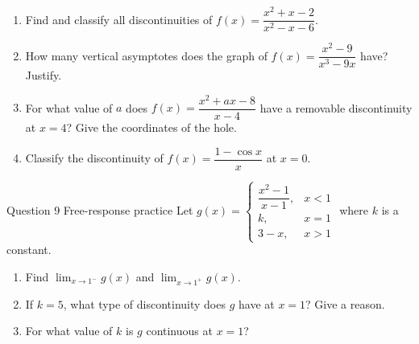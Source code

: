 \documentclass[11pt]{article}
\begin{document}
\begin{enumerate}[leftmargin=*,itemsep=2pt,start=5]
  \item Find and classify all discontinuities of $f(x)=\dfrac{x^2+x-2}{x^2-x-6}$.\work{2.8cm}
  \item How many vertical asymptotes does the graph of $f(x)=\dfrac{x^2-9}{x^3-9x}$ have? Justify.\work{2.8cm}
  \item For what value of $a$ does $f(x)=\dfrac{x^2+ax-8}{x-4}$ have a removable discontinuity at $x=4$? Give the coordinates of the hole.\work{2.8cm}
  \item Classify the discontinuity of $f(x)=\dfrac{1-\cos x}{x}$ at $x=0$.\work{2.8cm}
\end{enumerate}

\begin{frbox}{Question 9 \textperiodcentered{} Free-response practice}
Let $g(x)=\begin{cases}\dfrac{x^2-1}{x-1},&x<1\\[2mm]k,&x=1\\[1mm]3-x,&x>1\end{cases}$ where $k$ is a constant.
\begin{enumerate}[label=(\alph*),leftmargin=*,itemsep=2pt]
  \item Find $\displaystyle\lim_{x\to 1^-}g(x)$ and $\displaystyle\lim_{x\to 1^+}g(x)$.\work{2.6cm}
  \item If $k=5$, what type of discontinuity does $g$ have at $x=1$? Give a reason.\work{2.6cm}
  \item For what value of $k$ is $g$ continuous at $x=1$?\work{2.6cm}
\end{enumerate}
\end{frbox}
\end{document}
